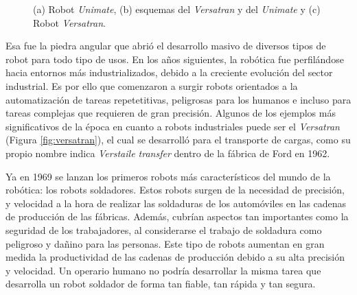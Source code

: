 \begin{figure}[htbp!]
	\begin{center}
		\hspace{0.1cm}
		\hspace{0.1cm}
	\end{center}	
	\centering
	\captionsetup{justification=centering,margin=2.5cm}
	\caption{(a) Robot \textit{Unimate}, (b) esquemas del \textit{Versatran} y del \textit{Unimate} y (c) Robot \textit{Versatran}.}
	\label{fig:robots1}
\end{figure}

Esa fue la piedra angular que abrió el desarrollo masivo de diversos tipos de robot para todo tipo de usos. En los años siguientes, la robótica fue perfilándose hacia entornos más industrializados, debido a la creciente evolución del sector industrial. Es por ello que comenzaron a surgir robots orientados a la automatización de tareas repetetitivas, peligrosas para los humanos e incluso para tareas complejas que requieren de gran precisión. Algunos de los ejemplos más significativos de la época en cuanto a robots industriales puede ser el \textit{Versatran} (Figura \ref{fig:versatran}), el cual se desarrolló para el transporte de cargas, como su propio nombre indica \textit{Verstaile transfer} dentro de la fábrica de Ford en 1962.

Ya en 1969 se lanzan los primeros robots más característicos del mundo de la robótica: los robots soldadores. Estos robots surgen de la necesidad de precisión, y velocidad a la hora de realizar las soldaduras de los automóviles en las cadenas de producción de las fábricas. Además, cubrían aspectos tan importantes como la seguridad de los trabajadores, al considerarse el trabajo de soldadura como peligroso y dañino para las personas. Este tipo de robots aumentan en gran medida la productividad de las cadenas de producción debido a su alta precisión y velocidad. Un operario humano no podría desarrollar la misma tarea que desarrolla un robot soldador de forma tan fiable, tan rápida y tan segura.

